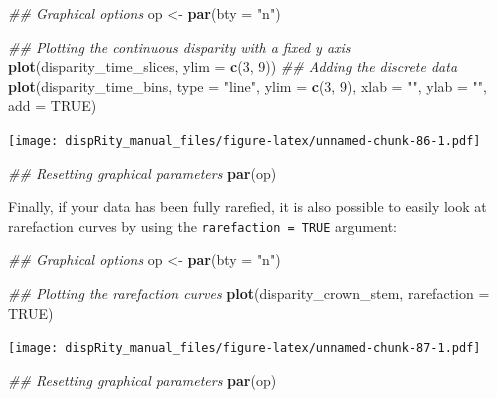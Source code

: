 \documentclass[
]{book}
\newenvironment{Shaded}{\begin{snugshade}}{\end{snugshade}}
\newcommand{\CommentTok}[1]{\textcolor[rgb]{0.56,0.35,0.01}{\textit{#1}}}
\newcommand{\DataTypeTok}[1]{\textcolor[rgb]{0.13,0.29,0.53}{#1}}
\newcommand{\DecValTok}[1]{\textcolor[rgb]{0.00,0.00,0.81}{#1}}
\newcommand{\KeywordTok}[1]{\textcolor[rgb]{0.13,0.29,0.53}{\textbf{#1}}}
\newcommand{\NormalTok}[1]{#1}
\newcommand{\OtherTok}[1]{\textcolor[rgb]{0.56,0.35,0.01}{#1}}
\newcommand{\StringTok}[1]{\textcolor[rgb]{0.31,0.60,0.02}{#1}}
\begin{document}
\begin{Shaded}
\begin{Highlighting}[]
\CommentTok{\#\# Graphical options}
\NormalTok{op \textless{}{-}}\StringTok{ }\KeywordTok{par}\NormalTok{(}\DataTypeTok{bty =} \StringTok{"n"}\NormalTok{)}

\CommentTok{\#\# Plotting the continuous disparity with a fixed y axis}
\KeywordTok{plot}\NormalTok{(disparity\_time\_slices, }\DataTypeTok{ylim =} \KeywordTok{c}\NormalTok{(}\DecValTok{3}\NormalTok{, }\DecValTok{9}\NormalTok{))}
\CommentTok{\#\# Adding the discrete data}
\KeywordTok{plot}\NormalTok{(disparity\_time\_bins, }\DataTypeTok{type =} \StringTok{"line"}\NormalTok{, }\DataTypeTok{ylim =} \KeywordTok{c}\NormalTok{(}\DecValTok{3}\NormalTok{, }\DecValTok{9}\NormalTok{),}
     \DataTypeTok{xlab =} \StringTok{""}\NormalTok{, }\DataTypeTok{ylab =} \StringTok{""}\NormalTok{, }\DataTypeTok{add =} \OtherTok{TRUE}\NormalTok{)}
\end{Highlighting}
\end{Shaded}

\texttt{[image: dispRity\_manual\_files/figure-latex/unnamed-chunk-86-1.pdf]}

\begin{Shaded}
\begin{Highlighting}[]
\CommentTok{\#\# Resetting graphical parameters}
\KeywordTok{par}\NormalTok{(op)}
\end{Highlighting}
\end{Shaded}

Finally, if your data has been fully rarefied, it is also possible to easily look at rarefaction curves by using the \texttt{rarefaction\ =\ TRUE} argument:

\begin{Shaded}
\begin{Highlighting}[]
\CommentTok{\#\# Graphical options}
\NormalTok{op \textless{}{-}}\StringTok{ }\KeywordTok{par}\NormalTok{(}\DataTypeTok{bty =} \StringTok{"n"}\NormalTok{)}

\CommentTok{\#\# Plotting the rarefaction curves}
\KeywordTok{plot}\NormalTok{(disparity\_crown\_stem, }\DataTypeTok{rarefaction =} \OtherTok{TRUE}\NormalTok{)}
\end{Highlighting}
\end{Shaded}

\texttt{[image: dispRity\_manual\_files/figure-latex/unnamed-chunk-87-1.pdf]}

\begin{Shaded}
\begin{Highlighting}[]
\CommentTok{\#\# Resetting graphical parameters}
\KeywordTok{par}\NormalTok{(op)}
\end{Highlighting}
\end{Shaded}
\end{document}

